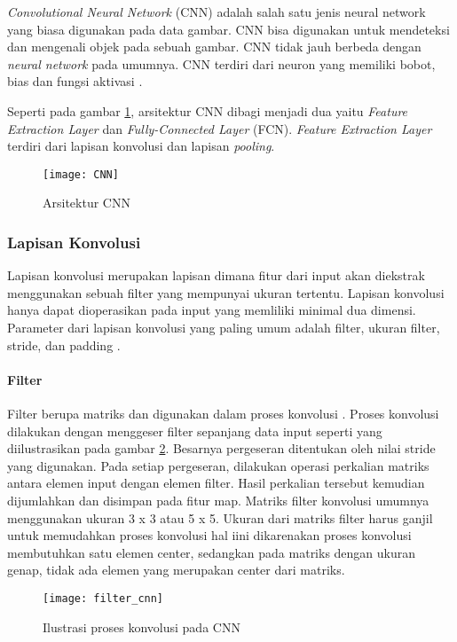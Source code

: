 \documentclass[../thesis.tex]{subfiles}
\begin{document}
\textit{Convolutional Neural Network} (CNN) adalah salah satu jenis neural network yang biasa digunakan pada data gambar. CNN bisa digunakan untuk mendeteksi dan mengenali objek pada sebuah gambar.
CNN tidak jauh berbeda dengan \textit{neural network} pada umumnya. CNN terdiri dari neuron yang memiliki bobot, bias dan fungsi aktivasi \cite{Wu2017IntroductionTC}.

Seperti pada gambar \ref{arsi_CNN}, arsitektur CNN dibagi menjadi dua yaitu \textit{Feature Extraction Layer} dan \textit{Fully-Connected Layer} (FCN). \textit{Feature Extraction Layer} terdiri dari lapisan konvolusi dan lapisan \textit{pooling}.
\begin{figure}[htp]
	\centering
	\texttt{[image: CNN]}
	\caption{Arsitektur CNN}
	\label{arsi_CNN}
\end{figure}

\subsubsection{Lapisan Konvolusi}
Lapisan konvolusi merupakan lapisan dimana fitur dari input akan diekstrak menggunakan sebuah filter yang mempunyai ukuran tertentu. Lapisan konvolusi hanya dapat
dioperasikan pada input yang memliliki minimal dua dimensi. Parameter dari lapisan konvolusi yang paling umum adalah filter, ukuran filter, stride, dan padding \cite{Wu2017IntroductionTC}.

\paragraph{Filter}

Filter berupa matriks dan digunakan dalam proses konvolusi \cite{Wu2017IntroductionTC}. Proses konvolusi dilakukan dengan menggeser filter sepanjang data input seperti yang diilustrasikan pada gambar \ref{konvolusi_CNN}. Besarnya pergeseran ditentukan oleh nilai stride yang digunakan. Pada setiap pergeseran, dilakukan operasi perkalian matriks antara elemen input dengan elemen filter. Hasil perkalian tersebut kemudian dijumlahkan dan 
disimpan pada fitur map. Matriks filter konvolusi umumnya menggunakan ukuran 3 x 3 atau 5 x 5. Ukuran dari matriks filter harus ganjil untuk memudahkan proses konvolusi hal iini dikarenakan proses konvolusi membutuhkan satu elemen center, sedangkan pada matriks dengan ukuran genap, tidak ada elemen yang merupakan center dari matriks.

\begin{figure}[htp]
	\centering
	\texttt{[image: filter\_cnn]}
	\caption{Ilustrasi proses konvolusi pada CNN}
	\label{konvolusi_CNN}
\end{figure}
\end{document}
